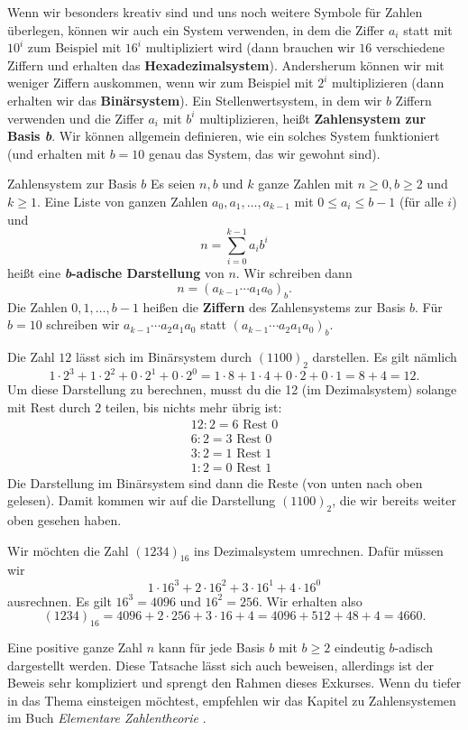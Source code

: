 \documentclass[../../main.tex]{subfiles}
\begin{document}
Wenn wir besonders kreativ sind und uns noch weitere Symbole für Zahlen überlegen, können wir auch ein System verwenden, in dem die Ziffer $a_i$ statt mit $10^i$ zum Beispiel mit $16^i$ multipliziert wird (dann brauchen wir $16$ verschiedene Ziffern und erhalten das \textbf{Hexadezimalsystem}). Andersherum können wir mit weniger Ziffern auskommen, wenn wir zum Beispiel mit $2^i$ multiplizieren (dann erhalten wir das \textbf{Binärsystem}). Ein Stellenwertsystem, in dem wir $b$ Ziffern verwenden und die Ziffer $a_i$ mit $b^i$ multiplizieren, heißt \textbf{Zahlensystem zur Basis \emph{b}}. Wir können allgemein definieren, wie ein solches System funktioniert (und erhalten mit $b=10$ genau das System, das wir gewohnt sind).
\begin{definition}{Zahlensystem zur Basis $b$}
    Es seien $n,b$ und $k$ ganze Zahlen mit $n\geq 0, b\geq 2$ und $k\geq 1$. Eine Liste von ganzen Zahlen $a_0,a_1,\dots,a_{k-1}$ mit $0\leq a_i\leq b-1$ (für alle $i$) und
    \[n=\sum_{i=0}^{k-1}a_ib^i\]
    heißt eine \textbf{\emph{b}-adische Darstellung} von $n$. Wir schreiben dann
    \[n=(a_{k-1}\cdots a_1a_0)_b.\]
    Die Zahlen $0,1,\dots,b-1$ heißen die \textbf{Ziffern} des Zahlensystems zur Basis $b$. Für $b=10$ schreiben wir $a_{k-1}\cdots a_2a_1a_0$ statt $(a_{k-1}\cdots a_2a_1a_0)_b$.
\end{definition}
\begin{advexample}{}
    Die Zahl $12$ lässt sich im Binärsystem durch $(1100)_2$ darstellen. Es gilt nämlich
    \[1\cdot 2^3+1\cdot 2^2+0\cdot 2^1+0\cdot 2^0=1\cdot 8+1\cdot 4+0\cdot 2+0\cdot 1=8+4=12.\]
    Um diese Darstellung zu berechnen, musst du die 12 (im Dezimalsystem) solange mit Rest durch $2$ teilen, bis nichts mehr übrig ist: 
    \begin{align*}
        12:2=6\text{ Rest }0\\
        6:2=3\text{ Rest }0\\
        3:2=1\text{ Rest }1\\
        1:2=0\text{ Rest }1
    \end{align*}
    Die Darstellung im Binärsystem sind dann die Reste (von unten nach oben gelesen). Damit kommen wir auf die Darstellung $(1100)_2$, die wir bereits weiter oben gesehen haben.
\end{advexample}
\begin{advexample}[ex:hexadezimal]{}
    Wir möchten die Zahl $(1234)_{16}$ ins Dezimalsystem umrechnen. Dafür müssen wir
    \[1\cdot 16^3+2\cdot 16^2+3\cdot 16^1+4\cdot 16^0\]
    ausrechnen. Es gilt $16^3=4096$ und $16^2=256$. Wir erhalten also
    \[(1234)_{16}=4096+2\cdot 256+3\cdot 16+4=4096+512+48+4=4660.\]
\end{advexample}
Eine positive ganze Zahl $n$ kann für jede Basis $b$ mit $b\geq 2$ eindeutig $b$-adisch dargestellt werden. Diese Tatsache lässt sich auch beweisen, allerdings ist der Beweis sehr kompliziert und sprengt den Rahmen dieses Exkurses. Wenn du tiefer in das Thema einsteigen möchtest, empfehlen wir das Kapitel zu Zahlensystemen im Buch \emph{Elementare Zahlentheorie} \cite{todo}.
\end{document}

